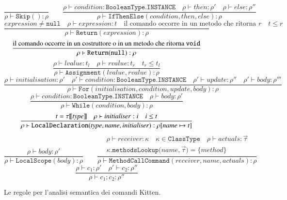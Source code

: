 \begin{figure}[t]
\begin{center}
{\small
  \[
    \frac{}
         {\rho\vdash\mathtt{Skip()}:\rho}\qquad
    \frac{\rho\vdash\mathit{condition}:\mathtt{BooleanType.INSTANCE}\quad
          \rho\vdash\mathit{then}:\rho'\quad
          \rho\vdash\mathit{else}:\rho''}
         {\rho\vdash\mathtt{IfThenElse(\mathit{condition},\mathit{then},
          \mathit{else}):\rho}}
  \]
  \[
    \frac{\mathit{expression}\not=\mathtt{null}\quad
          \rho\vdash\mathit{expression}:t\quad
          \text{il comando occorre in un metodo che ritorna $r$}
          \quad t\le r}
         {\rho\vdash\mathtt{Return(\mathit{expression})}:\rho}
  \]
  \[
    \frac{\text{il comando occorre in un costruttore o in un metodo che
                ritorna \texttt{void}}}
         {\rho\vdash\mathtt{Return(null)}:\rho}
  \]
  \[
    \frac{\rho\vdash\mathit{lvalue}:t_l\quad\rho\vdash\mathit{rvalue}:t_r
          \quad t_r\le t_l}
         {\rho\vdash\mathtt{Assignment(\mathit{lvalue},\mathit{rvalue})}:\rho}
  \]
  \[
    \frac{\rho\vdash\mathit{initialisation}:\rho'\quad
          \rho'\vdash\mathit{condition}:\mathtt{BooleanType.INSTANCE}\quad
          \rho'\vdash\mathit{update}:\rho''\quad
          \rho'\vdash\mathit{body}:\rho'''}
         {\rho\vdash\mathtt{For(\mathit{initialisation},\mathit{condition},
          \mathit{update},\mathit{body})}:\rho}
  \]
  \[
    \frac{\rho\vdash\mathit{condition}:\mathtt{BooleanType.INSTANCE}\quad
          \rho\vdash\mathit{body}:\rho'}
         {\rho\vdash\mathtt{While(\mathit{condition},\mathit{body})}:\rho}
  \]
  \[
    \frac{t={\tau[\![{\mathit{type}}]\!]}\quad\rho\vdash\mathit{initialiser}:i\quad 
          i\le t}
         {\rho\vdash\mathtt{LocalDeclaration(\mathit{type},\mathit{name},
          \mathit{initialiser})}:\rho[\mathit{name}\mapsto t]}
  \]
  \[
    \frac{\rho\vdash\mathit{body}:\rho'}
         {\rho\vdash\mathtt{LocalScope(\mathit{body})}:\rho}
    \qquad
     \frac{\begin{array}{c}
       \rho\vdash\mathit{receiver}:\kappa\quad\kappa\in\mathtt{ClassType}
         \quad\rho\vdash\mathit{actuals}:\vec{\tau}\\
       \kappa\mathtt{.methodsLookup(\mathit{name},}\vec{\tau})=
           \{\mathit{method}\}
       \end{array}}
          {\rho\vdash\mathtt{MethodCallCommand(\mathit{receiver},
           \mathit{name},\mathit{actuals})}:\rho}
  \]
  \[
    \frac{\rho\vdash c_1:\rho'\quad\rho'\vdash c_2:\rho''}
         {\rho\vdash c_1;c_2:\rho''}
  \]
}
\end{center}
\caption{Le regole per l'analisi semantica dei comandi Kitten.}
  \label{fig:analysis_commands}
\end{figure}
%
